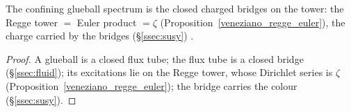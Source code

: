 \begin{theorem}\label{thm:confining}
The confining glueball spectrum is the closed charged bridges on the tower: the Regge tower
$=$ Euler product $=\zeta$ (Proposition~\ref{veneziano_regge_euler}), the charge carried by the bridges
(\S\ref{ssec:susy}) .


\end{theorem}
\begin{proof}
A glueball is a closed flux tube; the flux tube is a closed bridge (\S\ref{ssec:fluid}); its
excitations lie on the Regge tower, whose Dirichlet series is $\zeta$
(Proposition~\ref{veneziano_regge_euler}); the bridge carries the colour (\S\ref{ssec:susy}).
\end{proof}

